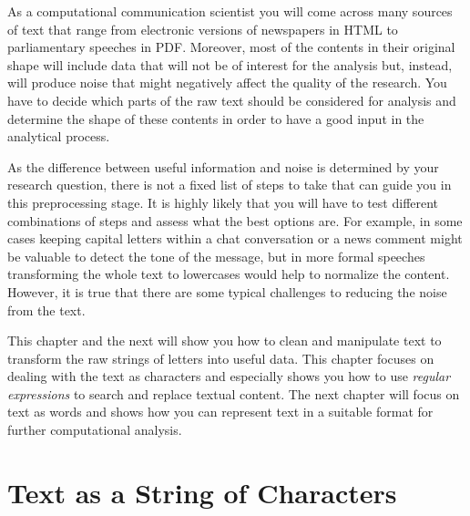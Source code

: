 As a computational communication scientist you will come across many sources of text that range from electronic versions of newspapers in HTML to parliamentary speeches in PDF. Moreover, most of the contents in their original shape will include data that will not be of interest for the analysis but, instead,  will produce noise that might negatively affect the quality of the research. You have to decide which parts of the raw text should be considered for analysis and determine the shape of these contents in order to have a good input in the analytical process.

As the difference between useful information and noise is determined by your research question,
there is not a fixed list of steps to take that can guide you in this preprocessing stage.
It is highly likely that you will have to test different combinations of steps and assess what  the best options are.
For example, in some cases keeping capital letters within a chat conversation or a news comment might be valuable to detect the tone of the message, but in more formal speeches transforming the whole text to lowercases would help to normalize the content.
However, it is true that there are some typical challenges to reducing the noise from the text.

This chapter and the next will show you how to clean and manipulate text to transform the raw strings of letters into useful data.
This chapter focuses on dealing with the text as characters and especially shows you how to use \emph{regular expressions} to search and replace textual content.
The next chapter will focus on text as words and shows how you can represent text in a suitable format for further computational analysis.

\section{Text as a String of Characters} \label{sec:unicode}


